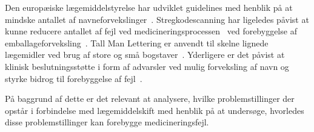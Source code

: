 Den europæiske lægemiddelstyrelse har udviklet guidelines med henblik på at mindske antallet af navneforvekslinger~\citep{DanskSelskabforPatientsikkerhed2009}.  Stregkodescanning har ligeledes påvist at kunne reducere antallet af fejl ved medicineringsprocessen~\citep{Poon2006, Levtzion-korach2010} ved forebyggelse af emballageforveksling~\citep{DanskSelskabforPatientsikkerhed2009}.  Tall Man Lettering er anvendt til skelne lignede lægemidler ved brug af store og små bogstaver~\citep{Campmans2018}. Yderligere er det påvist at klinisk beslutningsstøtte i form af advarsler ved mulig forveksling af navn og styrke bidrog til forebyggelse af fejl~\citep{Campmans2018}.

På baggrund af dette er det relevant at analysere, hvilke problemstillinger der opstår
i forbindelse med lægemiddelskift med henblik på at undersøge, hvorledes disse
problemstillinger kan forebygge medicineringsfejl. 


